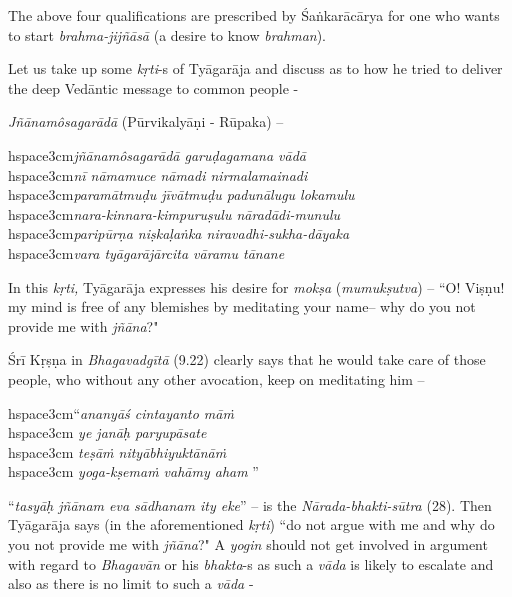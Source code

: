 The above four qualifications are prescribed by Śaṅkarācārya for one who wants to start \textit{brahma-jijñāsā} (a desire to know \textit{brahman}).

Let us take up some \textit{kṛti}-s of Tyāgarāja and discuss as to how he tried to deliver the deep Vedāntic message to common people -

\textit{Jñānamôsagarādā} (Pūrvikalyāṇi - Rūpaka) –

\begin{myquote}
hspace{3cm}\textit{jñānamôsagarādā garuḍagamana vādā} \\hspace{3cm}\textit{nī nāmamuce nāmadi nirmalamainadi} \\hspace{3cm}\textit{paramātmuḍu jīvātmuḍu padunālugu lokamulu}\\hspace{3cm}\textit{nara-kinnara-kimpuruṣulu nāradādi-munulu}\\hspace{3cm}\textit{paripūrṇa niṣkaḷaṅka niravadhi-sukha-dāyaka}\\hspace{3cm}\textit{vara tyāgarājārcita vāramu tānane}
\end{myquote}

In this \textit{kṛti,} Tyāgarāja expresses his desire for \textit{mokṣa} (\textit{mumukṣutva}) – ``O! Viṣṇu! my mind is free of any blemishes by meditating your name– why do you not provide me with \textit{jñāna}?"

Śrī Kṛṣṇa in \textit{Bhagavadgītā} (9.22) clearly says that he would take care of those people, who without any other avocation, keep on meditating him –

\begin{myquote}
hspace{3cm}“\textit{ananyāś cintayanto māṁ}\\hspace{3cm} \textit{ye janāḥ paryupāsate }\\hspace{3cm} \textit{teṣāṁ nityābhiyuktānāṁ}\\hspace{3cm} \textit{yoga-kṣemaṁ vahāmy aham} ”
\end{myquote}

“\textit{tasyāḥ jñānam eva sādhanam ity eke}” – is the \textit{Nārada-bhakti-sūtra} (28). Then Tyāgarāja says (in the aforementioned \textit{kṛti}) ``do not argue with me and why do you not provide me with \textit{jñāna}?" A \textit{yogin} should not get involved in argument with regard to \textit{Bhagavān} or his \textit{bhakta}-s as such a \textit{vāda} is likely to escalate and also as there is no limit to such a \textit{vāda} -

